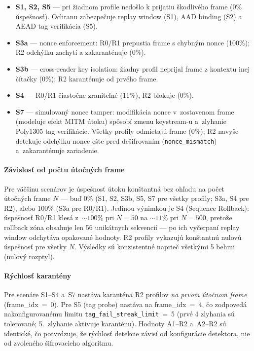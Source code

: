 \begin{itemize}[leftmargin=*,itemsep=2pt]
  \item \textbf{S1, S2, S5} --- pri žiadnom profile nedošlo k prijatiu škodlivého frame (0\% úspešnosť). Ochranu zabezpečuje replay window (S1), AAD binding (S2) a AEAD tag verifikácia (S5).
  \item \textbf{S3a} --- nonce enforcement: R0/R1 prepustia frame s chybným nonce (100\%); R2 odchýlku zachytí a zakaranténuje (0\%).
  \item \textbf{S3b} --- cross-reader key isolation: žiadny profil neprijal frame z kontextu inej čítačky (0\%); R2 karanténuje od prvého frame.
  \item \textbf{S4} --- R0/R1 čiastočne zraniteľné (11\%), R2 blokuje (0\%).
  \item \textbf{S7} --- simulovaný nonce tamper: modifikácia nonce v~zostavenom frame (modeluje efekt MITM útoku) spôsobí zmenu keystream-u a~zlyhanie Poly1305 tag verifikácie. Všetky profily odmietajú frame (0\%); R2 navyše detekuje odchýlku nonce ešte pred dešifrovaním (\texttt{nonce\_mismatch}) a~zakaranténuje zariadenie.
\end{itemize}

\paragraph{Závislosť od počtu útočných frame}

Pre väčšinu scenárov je úspešnosť útoku konštantná bez ohľadu na počet útočných frame $N$ --- buď 0\% (S1, S2, S3b, S5, S7 pre všetky profily; S3a, S4 pre R2), alebo 100\% (S3a pre R0/R1). Jedinou výnimkou je S4 (Sequence Rollback): úspešnosť R0/R1 klesá z~${\sim}100\%$ pri $N=50$ na ${\sim}11\%$ pri $N=500$, pretože rollback zóna obsahuje len 56 unikátnych sekvencií --- po ich vyčerpaní replay window odchytáva opakované hodnoty. R2 profily vykazujú konštantnú nulovú úspešnosť pre všetky $N$. Výsledky sú konzistentné naprieč všetkými 5 behmi (nulový rozptyl).

\paragraph{Rýchlosť karantény}

Pre scenáre S1--S4 a~S7 nastáva karanténa R2 profilov \emph{na prvom útočnom frame} (frame\_idx~=~0). Pre S5 (tag probe) nastáva na frame\_idx~=~4, čo zodpovedá nakonfigurovanému limitu \texttt{tag\_fail\_streak\_limit}~=~5 (prvé 4 zlyhania sú tolerované; 5.~zlyhanie aktivuje karanténu). Hodnoty A1--R2 a~A2--R2 sú identické, čo potvrdzuje, že rýchlosť detekcie závisí od konfigurácie detektora, nie od zvoleného šifrovacieho algoritmu.

